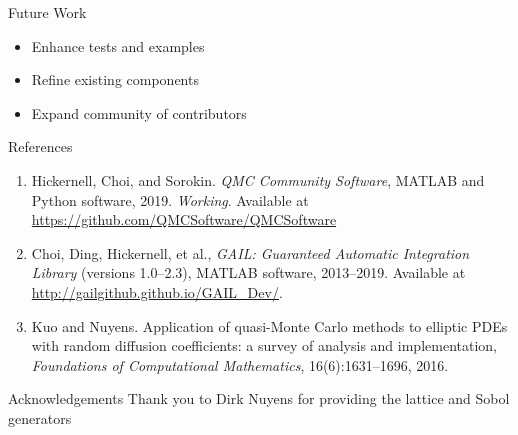 \documentclass[final]{beamer}
\newlength{\onecolwid}
\begin{document}
\begin{frame}[t]
\begin{columns}[t]
\begin{column}{\onecolwid}
\vspace{-.5in}
\begin{block}{Future Work}
    \begin{itemize}
        \item Enhance tests and examples 
        \item Refine existing components
        \item Expand community of contributors
    \end{itemize}
\end{block}

\begin{block}{References}
\begin{enumerate}
    
    \item Hickernell, Choi, and Sorokin. \textit{QMC Community Software}, MATLAB and Python software, 2019. \textit{Working}. Available at \url{https://github.com/QMCSoftware/QMCSoftware}
    
    \item Choi,  Ding,  Hickernell,  et al., \textit{GAIL: Guaranteed Automatic Integration Library} (versions 1.0--2.3),
    MATLAB software, 2013--2019. Available at \url{http://gailgithub.github.io/GAIL_Dev/}.
    
    \item Kuo and Nuyens. Application of quasi-Monte Carlo methods to elliptic PDEs with random diffusion coefficients: a survey of analysis and implementation, \textit{Foundations of Computational Mathematics}, 16(6):1631--1696, 2016.

\end{enumerate}
\end{block}
\begin{block}{Acknowledgements}
    Thank you to Dirk Nuyens for providing the lattice and Sobol generators 
\end{block}
\end{column}
\end{columns}
\end{frame}
\end{document}
